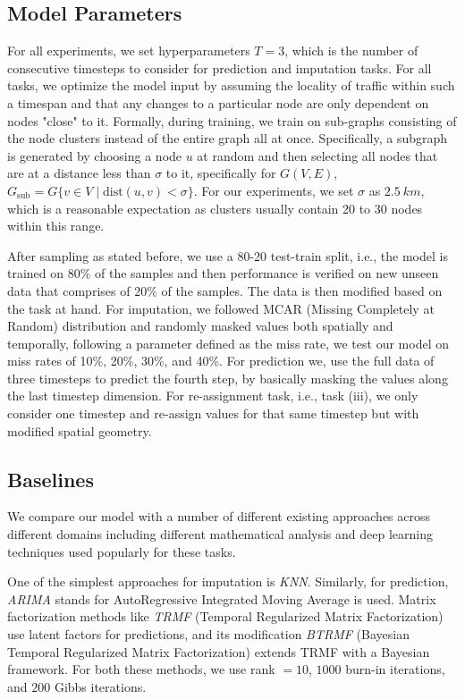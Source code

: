\subsection{Model Parameters}

For all experiments, we set hyperparameters $T = 3$, which is the number of consecutive timesteps to consider for prediction and imputation tasks. For all tasks, we optimize the model input by assuming the locality of traffic within such a timespan and that any changes to a particular node are only dependent on nodes "close" to it. Formally, during training, we train on sub-graphs consisting of the node clusters instead of the entire graph all at once. Specifically, a subgraph is generated by choosing a node $u$ at random and then selecting all nodes that are at a distance less than $\sigma$ to it, specifically for $G(V,E)$, $G_{\text{sub}} = G\{v \in V \; | \; \text{dist}(u, v) < \sigma\}$. For our experiments, we set $\sigma$ as $2.5\ km$, which is a reasonable expectation as clusters usually contain 20 to 30 nodes within this range.

After sampling as stated before, we use a 80-20 test-train split, i.e., the model is trained on 80\% of the samples and then performance is verified on new unseen data that comprises of 20\% of the samples. The data is then modified based on the task at hand. For imputation, we followed MCAR (Missing Completely at Random) distribution and randomly masked values both spatially and temporally, following a parameter defined as the miss rate, we test our model on miss rates of 10\%, 20\%, 30\%, and 40\%. For prediction we, use the full data of three timesteps to predict the fourth step, by basically masking the values along the last timestep dimension. For re-assignment task, i.e., task (iii), we only consider one timestep and re-assign values for that same timestep but with modified spatial geometry.

\subsection{Baselines}

We compare our \name model with a number of different existing approaches across different domains including different mathematical analysis and deep learning techniques used popularly for these tasks.

One of the simplest approaches for imputation is \textit{KNN}. Similarly, for prediction, \textit{ARIMA}\cite{arima} stands for AutoRegressive Integrated Moving Average is used. Matrix factorization methods like \textit{TRMF}\cite{trmf} (Temporal Regularized Matrix Factorization) use latent factors for predictions, and its modification \textit{BTRMF}\cite{btrmf} (Bayesian Temporal Regularized Matrix Factorization) extends TRMF with a Bayesian framework. For both these methods, we use rank $= 10$, $1000$ burn-in iterations, and $200$ Gibbs iterations.

